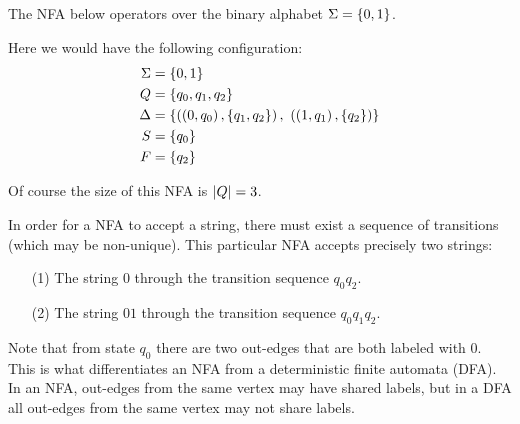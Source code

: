 \begin{example}[NFA]
  The NFA below operators over the binary alphabet
  \(\Sigma = \left\{0, 1\right\}\).

  \begin{center}
  \end{center}
  Here we would have the following configuration:
  \begin{align*}
    \Sigma &= \left\{0, 1\right\} \\
    Q &= \left\{q_0, q_1, q_2\right\} \\
    \Delta &=
      \left\{\left(\left(0, q_0\right), \left\{q_1, q_2\right\}\right), \ 
              \left(\left(1, q_1\right), \left\{q_2\right\}\right)\right\} \\
    S &= \left\{q_0\right\} \\
    F &= \left\{q_2\right\}
  \end{align*}

  Of course the size of this NFA is \(\left\lvert Q\right\rvert = 3\).

  In order for a NFA to accept a string, there must exist a sequence
  of transitions (which may be non-unique).
  This particular NFA accepts precisely two strings:
  \begin{enumerate}
    \item[(1)]
      The string \(0\) through the transition sequence \(q_0 q_2\).

    \item[(2)]
      The string \(01\) through the transition sequence \(q_0 q_1 q_2\).
  \end{enumerate}
  Note that from state \(q_0\) there are two out-edges that
  are both labeled with \(0\).
  This is what differentiates an NFA from a
  deterministic finite automata (DFA).
  In an NFA, out-edges from the same vertex may have shared labels,
  but in a DFA all out-edges from the same vertex may not share labels.

\end{example}



